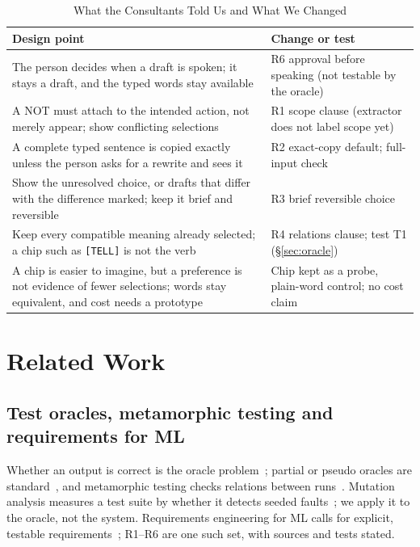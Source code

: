 \documentclass[conference,10pt]{IEEEtran}
\newcommand{\chip}[1]{\texttt{[#1]}}
\begin{document}
\begin{table}[t]
  \caption{What the Consultants Told Us and What We Changed}
  \label{tab:consult}
  \footnotesize
  \setlength{\tabcolsep}{3pt}
  \begin{tabularx}{\columnwidth}{@{}>{\raggedright\arraybackslash}X>{\raggedright\arraybackslash}X@{}}
    \toprule
    Design point & Change or test\\
    \midrule
    The person decides when a draft is spoken; it stays a draft, and the typed words stay available %
    & R6 approval before speaking (not testable by the oracle)\\
    A NOT must attach to the intended action, not merely appear; show conflicting selections %
    & R1 scope clause (extractor does not label scope yet)\\
    A complete typed sentence is copied exactly unless the person asks for a rewrite and sees it %
    & R2 exact-copy default; full-input check\\
    Show the unresolved choice, or drafts that differ with the difference marked; keep it brief and reversible %
    & R3 brief reversible choice\\
    Keep every compatible meaning already selected; a chip such as \chip{TELL} is not the verb
    & R4 relations clause; test T1 (\S\ref{sec:oracle})\\
    A chip is easier to imagine, but a preference is not evidence of fewer selections; words stay equivalent, and cost needs a prototype
    & Chip kept as a probe, plain-word control; no cost claim\\
    \bottomrule
  \end{tabularx}
\end{table}

\section{Related Work}
\subsection{Test oracles, metamorphic testing and requirements for ML}
Whether an output is correct is the oracle problem~\cite{barr2015oracle}; partial or pseudo oracles are standard~\cite{weyuker1982nontestable}, and metamorphic testing checks relations between runs~\cite{chen2018metamorphic}.
Mutation analysis measures a test suite by whether it detects seeded faults~\cite{jia2011mutation}; we apply it to the oracle, not the system.
Requirements engineering for ML calls for explicit, testable requirements~\cite{vogelsang2019re4ml}; R1--R6 are one such set, with sources and tests stated.
\end{document}

